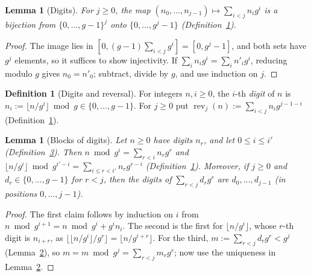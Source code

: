 \documentclass[11pt]{article}
\newcounter{hffc}
\theoremstyle{definition}\newtheorem{hffdef}[hffc]{Definition}
\theoremstyle{plain}\newtheorem{hfflem}[hffc]{Lemma}\newtheorem{hffthm}[hffc]{Theorem}
\theoremstyle{remark}\newtheorem{hffrem}[hffc]{Remark}
\newcommand{\hffcost}{}
\newcommand{\setcost}[1]{\renewcommand{\hffcost}{#1}}
\newcommand{\rev}{\operatorname{rev}}
\begin{document}
\begin{hfflem}[Digits]\label{L:digits}
For $j\ge0$, the map $(n_0,\dots,n_{j-1})\mapsto\sum_{i<j}n_ig^i$ is a bijection from $\{0,\dots,g-1\}^j$ onto $\{0,\dots,g^j-1\}$ (Definition~\hyperref[D:conv]{1}).
\par\nopagebreak{}
\end{hfflem}
\begin{proof}\setcost{length 174/300}The image lies in $[0,(g-1)\sum_{i<j}g^i]=[0,g^j-1]$, and both sets have $g^j$ elements, so it suffices to show injectivity. If $\sum_in_ig^i=\sum_in'_ig^i$, reducing modulo $g$ gives $n_0=n'_0$; subtract, divide by $g$, and use induction on $j$.
\end{proof}

\begin{hffdef}[Digits and reversal]\label{D:digits}
For integers $n,i\ge0$, the $i$-th \emph{digit} of $n$ is $n_i:=\lfloor n/g^i\rfloor\bmod g\in\{0,\dots,g-1\}$. For $j\ge0$ put $\rev_j(n):=\sum_{i<j}n_ig^{j-1-i}$ (Definition~\hyperref[D:conv]{1}).
\par\nopagebreak{}
\end{hffdef}

\begin{hfflem}[Blocks of digits]\label{L:window}
Let $n\ge0$ have digits $n_r$, and let $0\le i\le i'$ (Definition~\hyperref[D:digits]{3}). Then $n\bmod g^i=\sum_{r<i}n_rg^r$ and $\lfloor n/g^i\rfloor\bmod g^{i'-i}=\sum_{i\le r<i'}n_rg^{r-i}$ (Definition~\hyperref[D:conv]{1}). Moreover, if $j\ge0$ and $d_r\in\{0,\dots,g-1\}$ for $r<j$, then the digits of $\sum_{r<j}d_rg^r$ are $d_0,\dots,d_{j-1}$ (in positions $0,\dots,j-1$).
\par\nopagebreak{}
\end{hfflem}
\begin{proof}\setcost{length 213/300}The first claim follows by induction on $i$ from $n\bmod g^{i+1}=n\bmod g^i+g^in_i$. The second is the first for $\lfloor n/g^i\rfloor$, whose $r$-th digit is $n_{i+r}$, as $\lfloor\lfloor n/g^i\rfloor/g^r\rfloor= \lfloor n/g^{i+r}\rfloor$. For the third, $m:=\sum_{r<j}d_rg^r<g^j$ (Lemma~\hyperref[L:digits]{2}), so $m=m\bmod g^j=\sum_{r<j}m_rg^r$; now use the uniqueness in Lemma~\hyperref[L:digits]{2}.
\end{proof}
\end{document}
